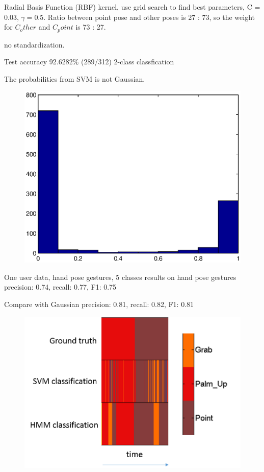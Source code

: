 Radial Basis Function (RBF) kernel, use grid search to find best parameters, C =
0.03, $\gamma = 0.5$. Ratio between point pose and other poses is 27 : 73, so
the weight for $C_other$ and $C_point$ is 73 : 27. 

no standardization.

Test accuracy 92.6282\% (289/312) 2-class classfication

The probabilities from SVM is not Gaussian. 

\begin{figure}[tbh]
\centering
\includegraphics{figures/hist_svm.eps}
\caption{}
\label{}
\end{figure}

One user data, hand pose gestures, 5 classes
results on hand pose gestures
precision: 0.74, recall: 0.77, F1: 0.75

Compare with Gaussian
precision: 0.81, recall: 0.82, F1: 0.81

\begin{figure}[tbh]
\centering
\includegraphics{figures/svm_hmm.png}
\end{figure}


